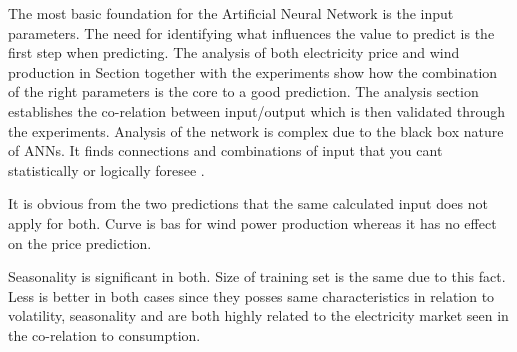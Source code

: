The most basic foundation for the Artificial Neural Network is the input parameters. The need for identifying what influences the value to predict is the first step when predicting. The analysis of both electricity price and wind production in Section together with the experiments show how the combination of the right parameters is the core to a good prediction. The analysis section establishes the co-relation between input/output which is then validated through the experiments. Analysis of the network is complex due to the black box nature of ANNs. It finds connections and combinations of input that you cant statistically or logically foresee .

It is obvious from the two predictions that the same calculated input does not apply for both. Curve is bas for wind power production whereas it has no effect on the price prediction.


Seasonality is significant in both. Size of training set is the same due to this fact. Less is better in both cases since they posses same characteristics in relation to volatility, seasonality and are both highly related to the electricity market seen in the co-relation to consumption.